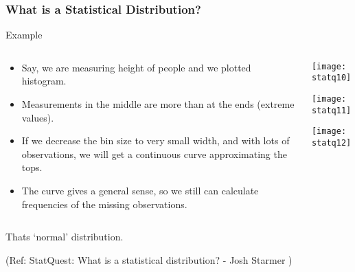 \begin{frame}[fragile]\frametitle{What is a Statistical Distribution?}

Example
\begin{columns}
    \begin{column}[T]{0.6\linewidth}
	\begin{itemize}
	\item Say, we are measuring height of people and we plotted histogram.
	\item Measurements in the middle are more than at the ends (extreme values).
	\item If we decrease the bin size to very small width, and with lots of observations, we will get a continuous curve approximating the tops.
	\item The curve gives a general sense, so we still can calculate frequencies of the missing observations.
	\end{itemize}

    \end{column}
    \begin{column}[T]{0.4\linewidth}
      \begin{center}
      \texttt{[image: statq10]}
	  
	  \texttt{[image: statq11]}
	  
	  \texttt{[image: statq12]}	  
	  	\end{center}
    \end{column}

  \end{columns}
  
Thats `normal' distribution.

\tiny{(Ref: StatQuest: What is a statistical distribution? - Josh Starmer )}
\end{frame}


